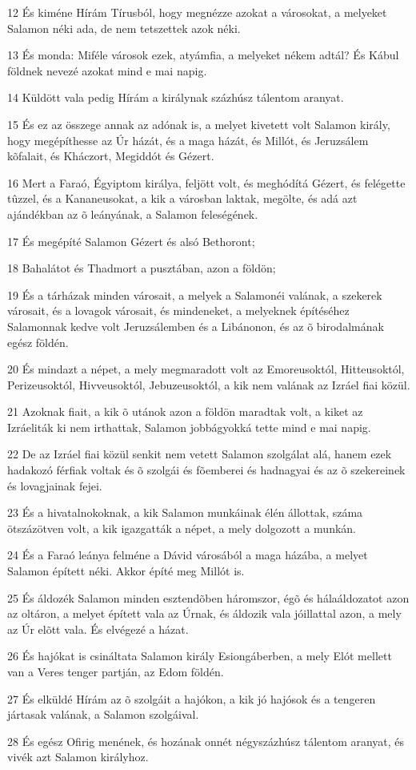 \par 12 És kiméne Hírám Tírusból, hogy megnézze azokat a városokat, a melyeket Salamon néki ada, de nem tetszettek azok néki.
\par 13 És monda: Miféle városok ezek, atyámfia, a melyeket nékem adtál? És Kábul földnek nevezé azokat mind e mai napig.
\par 14 Küldött vala pedig Hírám a királynak százhúsz tálentom aranyat.
\par 15 És ez az összege annak az adónak is, a melyet kivetett volt Salamon király, hogy megépíthesse az Úr házát, és a maga házát, és Millót, és Jeruzsálem kõfalait, és Kháczort, Megiddót és Gézert.
\par 16 Mert a Faraó, Égyiptom királya, feljött volt, és meghódítá Gézert, és felégette tûzzel, és a Kananeusokat, a kik a városban laktak, megölte, és adá azt ajándékban az õ leányának, a  Salamon feleségének.
\par 17 És megépíté Salamon Gézert és alsó Bethoront;
\par 18 Bahalátot és Thadmort a pusztában, azon a földön;
\par 19 És a tárházak minden városait, a melyek a Salamonéi valának, a szekerek városait, és a lovagok városait, és mindeneket, a melyeknek építéséhez Salamonnak kedve volt Jeruzsálemben és a Libánonon, és az õ birodalmának egész földén.
\par 20 És mindazt a népet, a mely megmaradott volt az Emoreusoktól, Hitteusoktól, Perizeusoktól, Hivveusoktól, Jebuzeusoktól, a kik nem valának az Izráel fiai közül.
\par 21 Azoknak fiait, a kik õ utánok azon a földön maradtak volt, a kiket az Izráeliták ki nem irthattak, Salamon jobbágyokká tette mind e mai napig.
\par 22 De az Izráel fiai közül senkit nem vetett Salamon szolgálat alá, hanem ezek hadakozó férfiak voltak és õ szolgái és fõemberei és hadnagyai és az õ szekereinek és lovagjainak fejei.
\par 23 És a hivatalnokoknak, a kik Salamon munkáinak élén állottak, száma ötszázötven volt, a kik igazgatták a népet, a mely dolgozott a munkán.
\par 24 És a Faraó leánya felméne a Dávid városából a maga házába, a melyet Salamon épített néki. Akkor építé meg Millót is.
\par 25 És áldozék Salamon minden esztendõben háromszor, égõ és hálaáldozatot azon az oltáron, a melyet épített vala az Úrnak, és áldozik vala jóillattal azon, a mely az Úr elõtt vala. És elvégezé a házat.
\par 26 És hajókat is csináltata Salamon király Esiongáberben, a mely Elót mellett van a Veres tenger partján, az Edom földén.
\par 27 És elküldé Hírám az õ szolgáit a hajókon, a kik jó hajósok és a tengeren jártasak valának, a Salamon szolgáival.
\par 28 És egész Ofirig menének, és hozának onnét négyszázhúsz tálentom aranyat, és vivék azt Salamon királyhoz.

